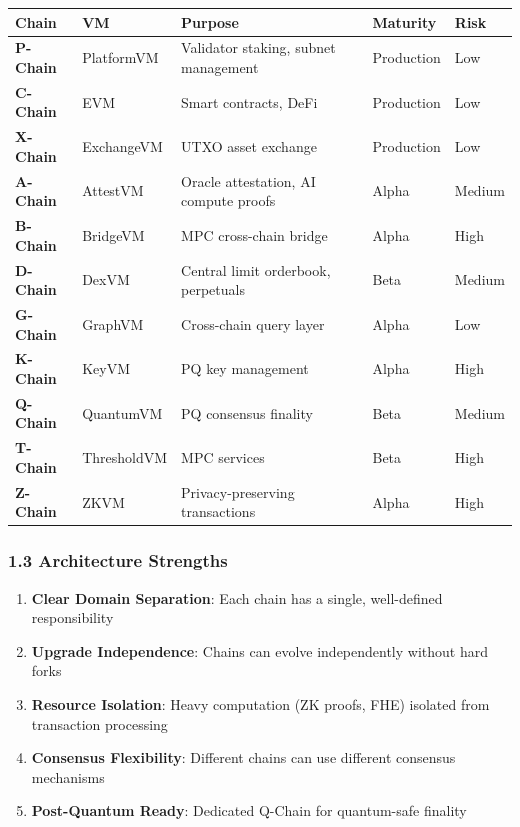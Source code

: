 \documentclass[
]{article}
\newcounter{none} %
\providecommand{\tightlist}{%
  \setlength{\itemsep}{0pt}\setlength{\parskip}{0pt}}
\begin{document}
{\def\LTcaptype{none} %
\begin{longtable}[]{@{}lllll@{}}
\toprule\noalign{}
Chain & VM & Purpose & Maturity & Risk \\
\midrule\noalign{}
\endhead
\bottomrule\noalign{}
\endlastfoot
\textbf{P-Chain} & PlatformVM & Validator staking, subnet management &
Production & Low \\
\textbf{C-Chain} & EVM & Smart contracts, DeFi & Production & Low \\
\textbf{X-Chain} & ExchangeVM & UTXO asset exchange & Production &
Low \\
\textbf{A-Chain} & AttestVM & Oracle attestation, AI compute proofs &
Alpha & Medium \\
\textbf{B-Chain} & BridgeVM & MPC cross-chain bridge & Alpha & High \\
\textbf{D-Chain} & DexVM & Central limit orderbook, perpetuals & Beta &
Medium \\
\textbf{G-Chain} & GraphVM & Cross-chain query layer & Alpha & Low \\
\textbf{K-Chain} & KeyVM & PQ key management & Alpha & High \\
\textbf{Q-Chain} & QuantumVM & PQ consensus finality & Beta & Medium \\
\textbf{T-Chain} & ThresholdVM & MPC services & Beta & High \\
\textbf{Z-Chain} & ZKVM & Privacy-preserving transactions & Alpha &
High \\
\end{longtable}
}

\subsubsection{1.3 Architecture
Strengths}\label{13-architecture-strengths}

\begin{enumerate}
\def\labelenumi{\arabic{enumi}.}
\tightlist
\item
  \textbf{Clear Domain Separation}: Each chain has a single,
  well-defined responsibility
\item
  \textbf{Upgrade Independence}: Chains can evolve independently without
  hard forks
\item
  \textbf{Resource Isolation}: Heavy computation (ZK proofs, FHE)
  isolated from transaction processing
\item
  \textbf{Consensus Flexibility}: Different chains can use different
  consensus mechanisms
\item
  \textbf{Post-Quantum Ready}: Dedicated Q-Chain for quantum-safe
  finality
\end{enumerate}
\end{document}
